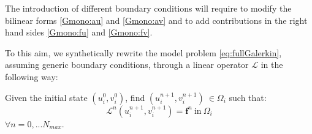 \documentclass[a4paper]{siamart190516}
\begin{document}
The introduction of different boundary conditions will require to modify the bilinear forms \eqref{Gmono:au} and \eqref{Gmono:av} and to add contributions in the right hand sides \eqref{Gmono:fu} and \eqref{Gmono:fv}.

To this aim, we synthetically rewrite the model problem \eqref{eq:fullGalerkin}, assuming generic boundary conditions, through a linear operator $\mathcal{L}$ in the following way:

Given the initial state $(u_i^0, v_i^0)$, find $(u_i^{n+1}, v_i^{n+1}) \ \in \Omega_i$ such that:
\begin{equation}\label{eq:modelpb}
\mathcal{L}^n (u_i^{n+1}, v_i^{n+1}) = \mathbf{f}^n \ \text{in} \ \Omega_i
\end{equation}
$\forall n = 0, ... N_{max}$.
\end{document}
